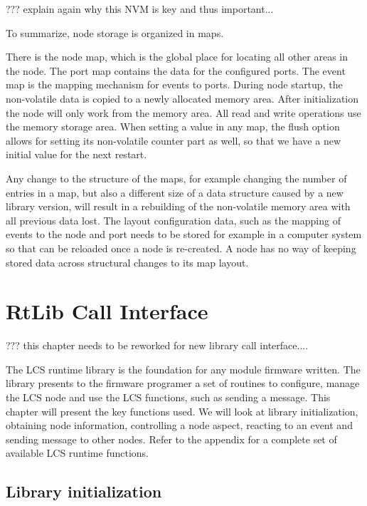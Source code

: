 ??? explain again why this NVM is key and thus important...

To summarize, node storage is organized in maps. 

There is the node map, which is the global place for locating all other areas in the node. The port map contains the data for the configured ports. The event map is the mapping mechanism for events to ports. During node startup, the non-volatile data is copied to a newly allocated memory area. After initialization the node will only work from the memory area. All read and write operations use the memory storage area. When setting a value in any map, the flush option allows for setting its non-volatile counter part as well, so that we have a new initial value for the next restart.

Any change to the structure of the maps, for example changing the number of entries in a map, but also a different size of a data structure caused by a new library version, will result in a rebuilding of the non-volatile memory area with all previous data lost. The layout configuration data, such as the mapping of events to the node and port needs to be stored for example in a computer system so that can be reloaded once a node is re-created. A node has no way of keeping stored data across structural changes to its map layout.

\chapter{RtLib Call Interface}

??? this chapter needs to be reworked for new library call interface....

The LCS runtime library is the foundation for any module firmware written. The library presents to the firmware programer a set of routines to configure, manage the LCS node and use the LCS functions, such as sending a message. This chapter will present the key functions used. We will look at library initialization, obtaining node information, controlling a node aspect, reacting to an event and sending message to other nodes.
Refer to the appendix for a complete set of available LCS runtime functions.

\section{Library initialization}

